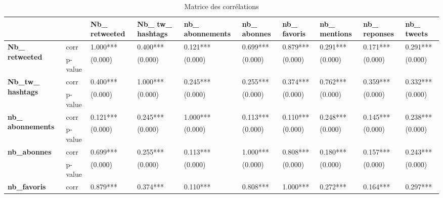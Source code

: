         \begin{landscape}

            \begin{table}
            \renewcommand{\arraystretch}{1.5}
            \begin{footnotesize}
                \caption{Matrice des corrélations}
                \label{table:12correlations}
                \begin{tabularx}{\linewidth}{|p{2cm}|X|X|X|X|X|X|X|X|X|}
                \hline
                &&\textbf{Nb\_ retweeted}&	\textbf{Nb\_ tw\_ hashtags}	&\textbf{nb\_ abonnements}	&\textbf{nb\_ abonnes}&	\textbf{nb\_ favoris}	&\textbf{nb\_ mentions}	&\textbf{nb\_ reponses}	&\textbf{nb\_ tweets}
                \\ \hline
                \multirow{2}{=}{\textbf{Nb\_ retweeted}}
                    &corr&1.000***&	0.400***&	0.121***&	0.699***&	0.879***&	0.291***&	0.171***&	0.291***\\
                    \cline{2-10}
                    &p-value&(0.000)&	(0.000)	&(0.000)&	(0.000)&	(0.000)	&(0.000)&	(0.000)&	(0.000)
                    \\ \hline
                \multirow{2}{=}{\textbf{Nb\_tw\_ hashtags}}
                    &corr&0.400***&	1.000***&	0.245***&	0.255***&	0.374***&	0.762***&	0.359***&	0.332***\\
                    \cline{2-10}
                    &p-value&(0.000)&	(0.000)	&(0.000)&	(0.000)	&(0.000)&	(0.000)	&(0.000)&	(0.000)
                    \\ \hline
                \multirow{2}{=}{\textbf{nb\_ abonnements}}
                    &corr&0.121***&	0.245***&	1.000***	&0.113***&	0.110***&	0.248***&	0.145***&	0.238***\\
                    \cline{2-10}
                    &p-value&	(0.000)&	(0.000)	&(0.000)	&(0.000)&	(0.000)&	(0.000)	&(0.000)&	(0.000)
                    \\ \hline
                \multirow{2}{=}{\textbf{nb\_abonnes}}
                    &corr&0.699***&	0.255***&	0.113***&	1.000***&	0.808***&	0.180***&	0.157***&	0.243***\\
                    \cline{2-10}
                    &p-value&(0.000)&	(0.000)	&(0.000)&	(0.000)&	(0.000)&	(0.000)&	(0.000)	&(0.000)
                    \\ \hline
                \multirow{2}{=}{\textbf{nb\_favoris}}
                    &corr&0.879***&	0.374***&	0.110***&	0.808***&	1.000***&	0.272***&	0.164***&	0.297***\\

\end{tabularx}
\end{footnotesize}
\end{table}
\end{landscape}
